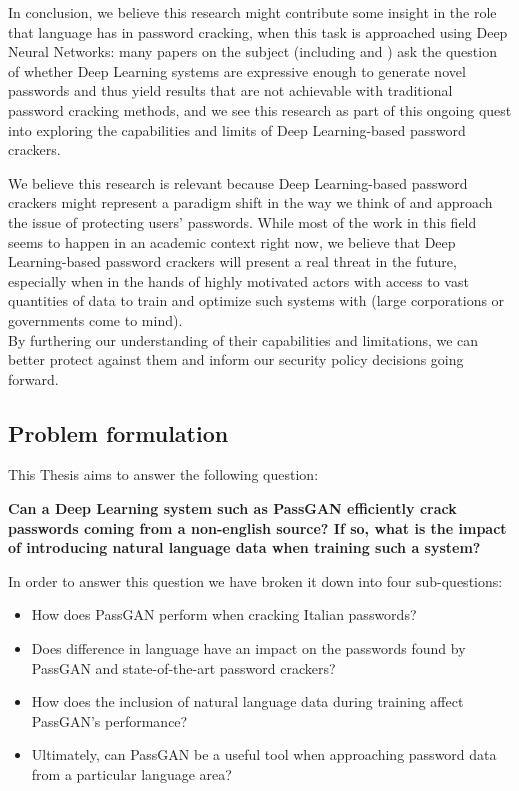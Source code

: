 In conclusion, we believe this research might contribute some insight in the role that language has in password cracking, when this task is approached using Deep Neural Networks: many papers on the subject (including \cite{PassGAN} and \cite{Melicher2016}) ask the question of whether Deep Learning systems are expressive enough to generate novel passwords and thus yield results that are not achievable with traditional password cracking methods, and we see this research as part of this ongoing quest into exploring the capabilities and limits of Deep Learning-based password crackers.

We believe this research is relevant because Deep Learning-based password crackers might represent a paradigm shift in the way we think of and approach the issue of protecting users' passwords.
While most of the work in this field seems to happen in an academic context right now, we believe that Deep Learning-based password crackers will present a real threat in the future, especially when in the hands of highly motivated actors with access to vast quantities of data to train and optimize such systems with (large corporations or governments come to mind).\\ 
By furthering our understanding of their capabilities and limitations, we can better protect against them and inform our security policy decisions going forward. 

\subsection{Problem formulation}\label{subsec:problem-formulation}
This Thesis aims to answer the following question:

\textbf{Can a Deep Learning system such as PassGAN efficiently crack passwords coming from a non-english source? If so, what is the impact of introducing natural language data when training such a system?}

In order to answer this question we have broken it down into four sub-questions:
\begin{itemize}
\item How does PassGAN perform when cracking Italian passwords? %
\item Does difference in language have an impact on the passwords found by PassGAN and state-of-the-art password crackers?    
\item How does the inclusion of natural language data during training affect PassGAN's performance?
\item Ultimately, can PassGAN be a useful tool when approaching password data from a particular language area? %
\end{itemize}



